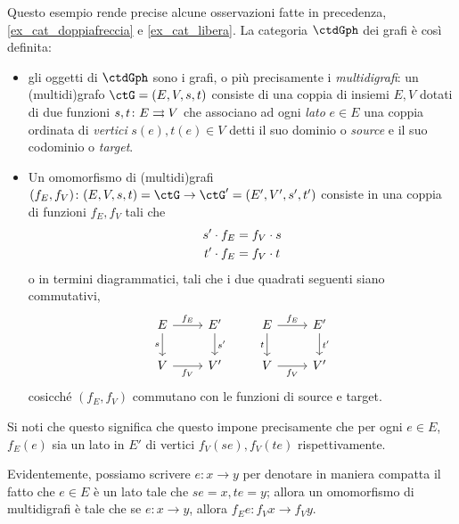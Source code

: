 \begin{example}\label{ex_cat_grafi}
 Questo esempio rende precise alcune osservazioni fatte in precedenza, \ref{ex_cat_doppiafreccia} e \ref{ex_cat_libera}. La categoria \(\ctdGph\) dei grafi è così definita:
 \begin{itemize}
  \item gli oggetti di \(\ctdGph\) sono i grafi, o più precisamente i \emph{multidigrafi}: un (multidi)grafo \(\ctG = (E,V,s,t)\) consiste di una coppia di insiemi \(E,V\) dotati di due funzioni \(s,t \colon E\rightrightarrows V\) che associano ad ogni \emph{lato} \(e\in E\) una coppia ordinata di \emph{vertici} \(s(e),t(e)\in V\) detti il suo dominio o \emph{source} e il suo codominio o \emph{target}.
  \item Un omomorfismo di (multidi)grafi \((f_E,f_V) \colon (E,V,s,t)=\ctG\to\ctG'= (E', V',s',t')\) consiste in una coppia di funzioni \(f_E, f_V\) tali che
        \begin{gather*}
         s'\cdot f_E = f_V\cdot s\\
         t'\cdot f_E = f_V\cdot t
        \end{gather*}
        o in termini diagrammatici, tali che i due quadrati seguenti siano commutativi,
        \[\begin{tikzcd}
          E & {E'} & E & {E'} \\
          V & {V'} & V & {V'}
          \arrow["{f_E}", from=1-1, to=1-2]
          \arrow["{s'}", from=1-2, to=2-2]
          \arrow["{f_V}"', from=2-1, to=2-2]
          \arrow["s"', from=1-1, to=2-1]
          \arrow["{f_E}", from=1-3, to=1-4]
          \arrow["{f_V}"', from=2-3, to=2-4]
          \arrow["{t'}", from=1-4, to=2-4]
          \arrow["t"', from=1-3, to=2-3]
         \end{tikzcd}\]
        cosicché \((f_E,f_V)\) commutano con le funzioni di source e target.
 \end{itemize}
 Si noti che questo significa che questo impone precisamente che per ogni \(e\in E\), \(f_E(e)\) sia un lato in \(E'\) di vertici \(f_V(se), f_V(te)\) rispettivamente.
\end{example}
Evidentemente, possiamo scrivere \(e \colon x\to y\) per denotare in maniera compatta il fatto che \(e \in E\) è un lato tale che \(se=x,te=y\); allora un omomorfismo di multidigrafi è tale che se \(e \colon x\to y\), allora \(f_Ee \colon f_Vx\to f_Vy\).
